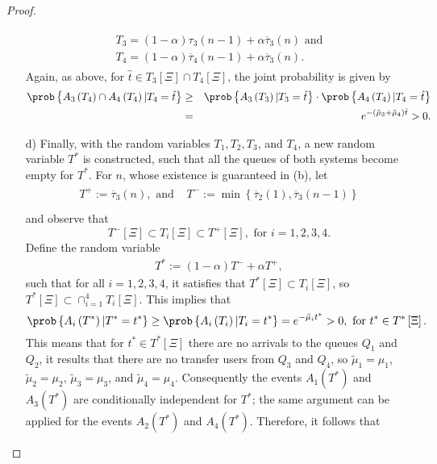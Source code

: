 \begin{proof}
\begin{itemize}
\begin{eqnarray}
\begin{array}{l}
T_{3}=\left(1-\alpha\right)\tau_{3}\left(n-1\right)
+\alpha\overline{\tau}_{3}\left(n\right)\textrm{ and}\\
T_{4}=\left(1-\alpha\right)\overline{\tau}_{4}\left(n-1\right)+\alpha
\overline{\tau}_{3}\left(n\right).
\end{array}
\end{eqnarray}
Again, as above, for $\hat{t}\in  T_{3}\left[\Xi\right]\cap T_{4}\left[\Xi\right]$, the joint probability is given by
\begin{eqnarray*}\medskip
\prob\left\{A_{3}\left(T_{4}\right)\cap
A_{4}\left(T_{4}\right)|T_{4}=\hat{t}\right\}&\geq&
\prob\left\{A_{3}\left(T_{3}\right)|T_{3}=\hat{t}\right\}\cdot
\prob\left\{A_{4}\left(T_{4}\right)|T_{4}=\hat{t}\right\}\\
&=&e^{-\left(\tilde{\mu}_{3}+\tilde{\mu}_{4}\right)\hat{t}}>0.
\end{eqnarray*}%
\item[d)] Finally, with the random variables $T_{1},T_{2},T_{3}$, and $T_{4}$, a new random variable $T^{*}$ is constructed, such that all the queues of both systems become empty for $T^{*}$. For $n$, whose existence is guaranteed in (b), let
\begin{eqnarray}
\begin{array}{lc}
T^{+}:=\overline{\tau}_{3}\left(n\right),\textrm{ and }&
T^{-}:=\min\left\{\overline{\tau}_{2}\left(1\right),\overline{\tau}_{3}\left(n-1\right)\right\}\\
\end{array}
\end{eqnarray}
and observe that  $$T^{-}\left[\Xi\right]\subset T_{i}\left[\Xi\right]\subset T^{+}\left[\Xi\right],\textrm{ for }i=1,2,3,4.$$
Define the random variable
\begin{eqnarray}
T^{*}:=\left(1-\alpha\right)T^{-}+\alpha T^{+},
\end{eqnarray}
such that for all $i=1,2,3,4$, it satisfies that $T^{*}\left[\Xi\right]\subset T_{i}\left[\Xi\right]$, so  $T^{*}\left[\Xi\right]\subset \cap_{i=1}^{4}T_{i}\left[\Xi\right]$. This implies that
\begin{equation}
\prob\left\{A_{i}\left(T^{*}\right)|T^{*}=t^{*}\right\}\geq\prob\left\{A_{i}\left(T_{i}\right)|T_{i}=t^{*}\right\}=e^{-\tilde{\mu}_{i}t^{*}}>0,\textrm{ for }t^{*}\in T^{*}\left[\Xi\right].
\end{equation}
This means that for $t^{*}\in T^{*}\left[\Xi\right]$ there are no arrivals to the queues $Q_{1}$ and $Q_{2}$, it results that there are no transfer users from $Q_{3}$ and $Q_{4}$, so $\tilde{\mu}_{1}=\mu_{1}$, $\tilde{\mu}_{2}=\mu_{2}$, $\tilde{\mu}_{3}=\mu_{3}$, and $\tilde{\mu}_{4}=\mu_{4}$. Consequently the events $A_{1}\left(T^{*}\right)$ and $A_{3}\left(T^{*}\right)$ are conditionally independent for $T^{*}$; the same argument can be applied for the events $A_{2}\left(T^{*}\right)$ and $A_{4}\left(T^{*}\right)$. Therefore, it follows that

\end{itemize}
\end{proof}
